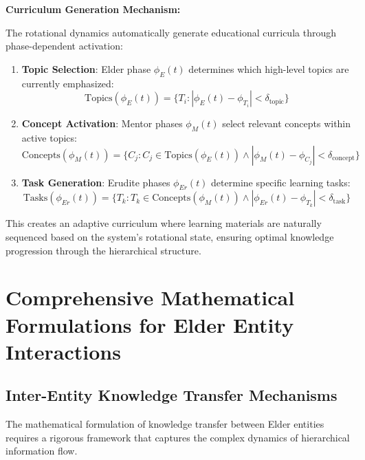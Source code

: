 \textbf{Curriculum Generation Mechanism:}

The rotational dynamics automatically generate educational curricula through phase-dependent activation:

\begin{enumerate}
    \item \textbf{Topic Selection}: Elder phase $\phi_E(t)$ determines which high-level topics are currently emphasized:
    \begin{equation}
    \text{Topics}(\phi_E(t)) = \{T_i : |\phi_E(t) - \phi_{T_i}| < \delta_{\text{topic}}\}
    \end{equation}
    
    \item \textbf{Concept Activation}: Mentor phases $\phi_M(t)$ select relevant concepts within active topics:
    \begin{equation}
    \text{Concepts}(\phi_M(t)) = \{C_j : C_j \in \text{Topics}(\phi_E(t)) \land |\phi_M(t) - \phi_{C_j}| < \delta_{\text{concept}}\}
    \end{equation}
    
    \item \textbf{Task Generation}: Erudite phases $\phi_{Er}(t)$ determine specific learning tasks:
    \begin{equation}
    \text{Tasks}(\phi_{Er}(t)) = \{T_k : T_k \in \text{Concepts}(\phi_M(t)) \land |\phi_{Er}(t) - \phi_{T_k}| < \delta_{\text{task}}\}
    \end{equation}
\end{enumerate}

This creates an adaptive curriculum where learning materials are naturally sequenced based on the system's rotational state, ensuring optimal knowledge progression through the hierarchical structure.

\section{Comprehensive Mathematical Formulations for Elder Entity Interactions}

\subsection{Inter-Entity Knowledge Transfer Mechanisms}

The mathematical formulation of knowledge transfer between Elder entities requires a rigorous framework that captures the complex dynamics of hierarchical information flow.

